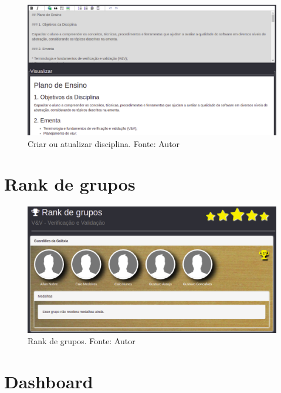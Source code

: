 \begin{apendicesenv}
\begin{figure}[h!]
	\centering
  \includegraphics[keepaspectratio=true,scale=0.42]{figuras/disciplina.eps}
  \caption[Criar ou atualizar disciplina]{Criar ou atualizar disciplina. Fonte: Autor}
	\label{fig:disciplina}
\end{figure}

\section{Rank de grupos}

\begin{figure}[h!]
	\centering
  \includegraphics[keepaspectratio=true,scale=0.57]{figuras/rank.eps}
  \caption[Rank de grupos]{Rank de grupos. Fonte: Autor}
	\label{fig:rank}
\end{figure}

\section{Dashboard}


\end{apendicesenv}
